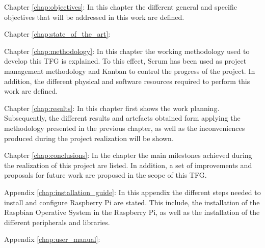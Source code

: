 \begin{definitionlist}
	\item[Chapter \ref{chap:objectives}: \nameref{chap:objectives}] In this chapter the different general and specific objectives that will be addressed in this work are defined.
	
	\item[Chapter \ref{chap:state_of_the_art}: \nameref{chap:state_of_the_art}] 
	
	\item[Chapter \ref{chap:methodology}: \nameref{chap:methodology}] In this chapter the working methodology used to develop this \ac{TFG} is explained. To this effect, Scrum has been used as project management methodology and Kanban to control the progress of the project. In addition, the different physical and software resources required to perform this work are defined.
	
	\item[Chapter \ref{chap:results}: \nameref{chap:results}] In this chapter first shows the work planning. Subsequently, the different results and artefacts obtained form applying the methodology presented in the previous chapter, as well as the inconveniences produced during the project realization will be shown. 
	
	\item[Chapter \ref{chap:conclusions}: \nameref{chap:conclusions}] In the chapter the main milestones achieved during the realization of this project are listed. In addition, a set of improvements and proposals for future work are proposed in the scope of this \ac{TFG}. 
	
	\item[Appendix \ref{chap:installation_guide}: \nameref{chap:installation_guide}] In this appendix the different steps needed to install and configure Raspberry Pi are stated. This include, the installation of the Raspbian Operative System in the Raspberry Pi, as well as the installation of the different peripherals and libraries.
	
	\item[Appendix \ref{chap:user_manual}: \nameref{chap:user_manual}] 
\end{definitionlist}


